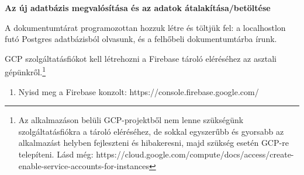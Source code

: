 \documentclass[
  magyar,
]{article}
\begin{document}
\textbf{Az új adatbázis megvalósítása és az adatok
átalakítása/betöltése}

A dokumentumtárat programozottan hozzuk létre és töltjük fel: a
localhostlon futó Postgres adatbázisból olvasunk, és a felhőbeli
dokumentumtárba írunk.

GCP szolgáltatásfiókot kell létrehozni a Firebase tároló eléréséhez az
asztali gépünkről.\footnote{Az alkalmazáson belüli GCP-projektből nem
  lenne szükségünk szolgáltatásfiókra a tároló eléréséhez, de sokkal
  egyszerűbb és gyorsabb az alkalmazást helyben fejleszteni és
  hibakeresni, majd szükség esetén GCP-re telepíteni. Lásd még:
  https://cloud.google.com/compute/docs/access/create-enable-service-accounts-for-instances}

\begin{enumerate}
\def\labelenumi{\arabic{enumi}.}
\item
  Nyisd meg a Firebase konzolt: https://console.firebase.google.com/


\end{enumerate}
\end{document}
